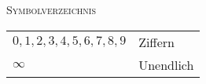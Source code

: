 \documentclass[a4paper]{amsart}
\theoremstyle{definition}
\begin{document}
\begin{large}
    \centerline{\textsc{Symbolverzeichnis}}
\end{large}
\bigskip

\renewcommand*{\arraystretch}{1}

\begin{tabular}{ll}
    $0,1,2,3,4,5,6,7,8,9$          & Ziffern\\
    $\infty$                       & Unendlich
\end{tabular}
\end{document}
